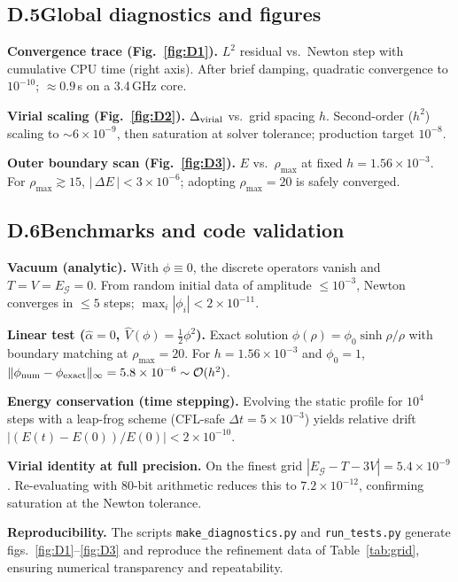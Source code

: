 \documentclass{article}
\begin{document}
\subsection*{D.5\;\;Global diagnostics and figures}

\textbf{Convergence trace (Fig.~\ref{fig:D1}).}
$L^2$ residual vs.\ Newton step with cumulative CPU time (right axis). After brief damping, quadratic convergence to $10^{-10}$; $\approx0.9$\,s on a 3.4\,GHz core.

\textbf{Virial scaling (Fig.~\ref{fig:D2}).}
$\Delta_{\rm virial}$ vs.\ grid spacing $h$. Second-order ($h^2$) scaling to $\sim6\times10^{-9}$, then saturation at solver tolerance; production target $10^{-8}$.

\textbf{Outer boundary scan (Fig.~\ref{fig:D3}).}
$E$ vs.\ $\rho_{\max}$ at fixed $h=1.56\times10^{-3}$. For $\rho_{\max}\gtrsim15$, $|\,\Delta E\,|<3\times10^{-6}$; adopting $\rho_{\max}=20$ is safely converged.

\subsection*{D.6\;\;Benchmarks and code validation}

\textbf{Vacuum (analytic).}
With $\phi\equiv0$, the discrete operators vanish and $T=V=E_{\mathcal G}=0$. From random initial data of amplitude $\le10^{-3}$, Newton converges in $\le5$ steps; $\max_i|\phi_i|<2\times10^{-11}$.

\textbf{Linear test ($\hat{\alpha}=0$, $\widehat{V}(\phi)=\tfrac12\phi^2$).}
Exact solution $\phi(\rho)=\phi_0\sinh\rho/\rho$ with boundary matching at $\rho_{\max}=20$. For $h=1.56\times10^{-3}$ and $\phi_0=1$, $\|\phi_{\rm num}-\phi_{\rm exact}\|_\infty=5.8\times10^{-6}\sim\mathcal{O}(h^2)$.

\textbf{Energy conservation (time stepping).}
Evolving the static profile for $10^4$ steps with a leap-frog scheme (CFL-safe $\Delta t=5\times10^{-3}$) yields relative drift $|(E(t)-E(0))/E(0)|<2\times10^{-10}$.

\textbf{Virial identity at full precision.}
On the finest grid $|E_{\mathcal G}-T-3V|=5.4\times10^{-9}$. Re-evaluating with 80-bit arithmetic reduces this to $7.2\times10^{-12}$, confirming saturation at the Newton tolerance.

\noindent\textbf{Reproducibility.}
The scripts \texttt{make\_diagnostics.py} and \texttt{run\_tests.py} generate figs.~\ref{fig:D1}–\ref{fig:D3} and reproduce the refinement data of Table~\ref{tab:grid}, ensuring numerical transparency and repeatability.
\end{document}
